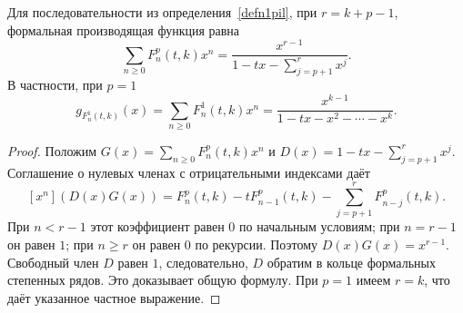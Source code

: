 \begin{lemma}\label{lemgenn1}
Для последовательности из определения~\ref{defn1pil}, при $r=k+p-1$,
формальная производящая функция равна
\[
 \sum_{n\ge0}F_n^p(t,k)x^n
 =\frac{x^{r-1}}{1-tx-\sum_{j=p+1}^{r}x^j}.
\]
В частности, при $p=1$
\begin{equation}
 g_{F_n^1(t,k)}(x)
 =\sum_{n\ge0}F_n^1(t,k)x^n
 =\frac{x^{k-1}}{1-tx-x^2-\cdots-x^k}.
\end{equation}
\end{lemma}
\begin{proof}
Положим $G(x)=\sum_{n\ge0}F_n^p(t,k)x^n$ и
$D(x)=1-tx-\sum_{j=p+1}^{r}x^j$.
Соглашение о нулевых членах с отрицательными индексами даёт
\[
 [x^n](D(x)G(x))
 =F_n^p(t,k)-tF_{n-1}^p(t,k)
       -\sum_{j=p+1}^{r}F_{n-j}^p(t,k).
\]
При $n<r-1$ этот коэффициент равен $0$ по начальным условиям;
при $n=r-1$ он равен $1$; при $n\ge r$ он равен $0$
по рекурсии. Поэтому $D(x)G(x)=x^{r-1}$.
Свободный член $D$ равен $1$, следовательно, $D$ обратим
в кольце формальных степенных рядов. Это доказывает общую формулу.
При $p=1$ имеем $r=k$, что даёт указанное частное выражение.
\end{proof}
